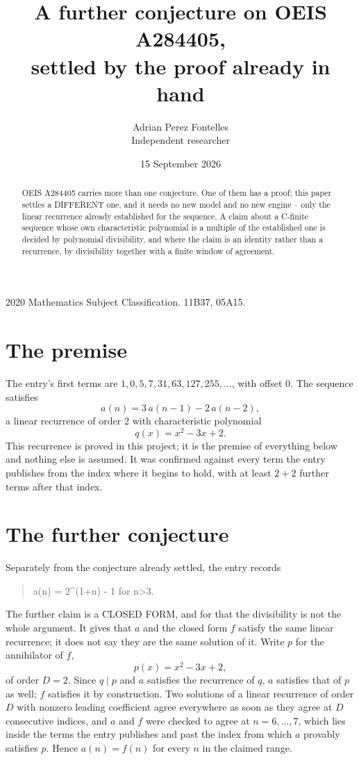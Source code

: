 \documentclass[11pt,a4paper]{article}
\title{A further conjecture on OEIS A284405,\\ \large settled by the proof already in hand}
\author{Adrian Perez Fontelles\\ \small Independent researcher}
\date{15 September 2026}
\theoremstyle{plain}
\theoremstyle{definition}
\begin{document}
\maketitle

\begin{abstract}
OEIS A284405 carries more than one conjecture. One of them has a proof; this paper settles a
DIFFERENT one, and it needs no new model and no new engine -- only the linear recurrence already
established for the sequence. A claim about a C-finite sequence whose own characteristic
polynomial is a multiple of the established one is decided by polynomial divisibility, and where
the claim is an identity rather than a recurrence, by divisibility together with a finite window
of agreement.
\end{abstract}

\noindent\small 2020 Mathematics Subject Classification. 11B37, 05A15.\normalsize

\section{The premise}

The entry's first terms are $1, 0, 5, 7, 31, 63, 127, 255,\dots$, with offset $0$. The sequence satisfies
\[
  a(n)=3\,a(n-1) - 2\,a(n-2) ,
\]
a linear recurrence of order $2$ with characteristic polynomial
\[
  q(x)=x^{2} - 3 x + 2 .
\]
This recurrence is proved in this project; it is the premise of everything below and nothing else is assumed.
It was confirmed against every term the entry publishes from the index where it begins to hold,
with at least $2+2$ further terms after that index.

\section{The further conjecture}

Separately from the conjecture already settled, the entry records

\begin{quote}\raggedright a(n) = 2\^{}(1+n) - 1 for n>3.\end{quote}

The further claim is a CLOSED FORM, and for that the divisibility is not the whole argument. It
gives that $a$ and the closed form $f$ satisfy the same linear recurrence; it does not say they
are the same solution of it. Write $p$ for the annihilator of $f$,
\[
  p(x)=x^{2} - 3 x + 2 ,
\]
of order $D=2$. Since $q\mid p$ and $a$ satisfies the recurrence of $q$, $a$ satisfies that of
$p$ as well; $f$ satisfies it by construction. Two solutions of a linear recurrence of order $D$
with nonzero leading coefficient agree everywhere as soon as they agree at $D$ consecutive
indices, and $a$ and $f$ were checked to agree at $n=6,\dots,7$,
which lies inside the terms the entry publishes and past the index from which $a$ provably
satisfies $p$. Hence $a(n)=f(n)$ for every $n$ in the claimed range.
\end{document}
